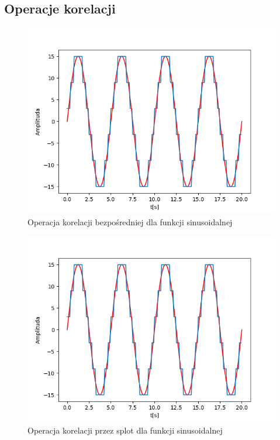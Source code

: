 \documentclass[12pt]{article}
\begin{document}
\subsection{Operacje korelacji}
\begin{figure}[H]
\centering
\includegraphics[scale=0.6]{1sinusKwantStopien5.png}
\caption{Operacja korelacji bezpośredniej dla funkcji sinusoidalnej}
\end{figure}

\begin{figure}[H]
\centering
\includegraphics[scale=0.6]{1sinusKwantStopien5.png}
\caption{Operacja korelacji przez splot dla funkcji sinusoidalnej}
\end{figure}
\end{document}
